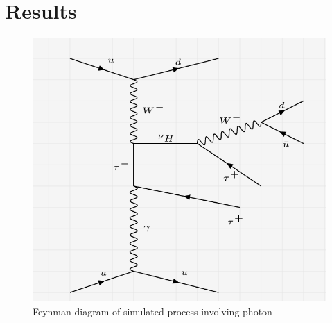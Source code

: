 \documentclass[12pt]{article}
\begin{document}
\section{Results}

\begin{figure}[H]
\centering
\includegraphics[scale = 0.45]{Figures/Feynman_hnGamma.png}
\caption{Feynman diagram of simulated process involving photon}
\label{fig: hnGamma}
\end{figure}
\end{document}
